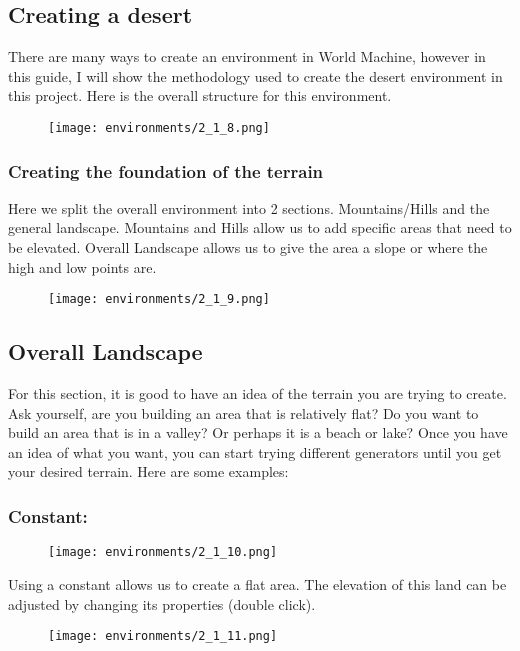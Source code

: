 \documentclass[../main.tex]{subfiles}
\begin{document}
\subsection{Creating a desert}
There are many ways to create an environment in World Machine, however in this guide, I will show the methodology used to create the desert environment in this project.
Here is the overall structure for this environment.
\begin{figure}[H]
\texttt{[image: environments/2\_1\_8.png]}
\end{figure}
\subsubsection{Creating the foundation of the terrain}
Here we split the overall environment into 2 sections. Mountains/Hills and the general landscape. Mountains and Hills allow us to add specific areas that need to be elevated.
Overall Landscape allows us to give the area a slope or where the high and low points are.
\begin{figure}[H]
\texttt{[image: environments/2\_1\_9.png]}
\end{figure}
\subsection{Overall Landscape}
For this section, it is good to have an idea of the terrain you are trying to create.
Ask yourself, are you building an area that is relatively flat? Do you want to build an area that is in a valley? Or perhaps it is a beach or lake?
Once you have an idea of what you want, you can start trying different generators until you get your desired terrain. Here are some examples:

\subsubsection{Constant:}
\begin{figure}[H]
\texttt{[image: environments/2\_1\_10.png]}
\end{figure}
Using a constant allows us to create a flat area. The elevation of this land can be adjusted by changing its properties (double click).
\begin{figure}[H]
\texttt{[image: environments/2\_1\_11.png]}
\end{figure}
\end{document}
